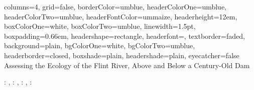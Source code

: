 \documentclass[b0paper,margin=1cm,landscape]{baposter}
\begin{document}

\begin{poster}{
    columns=4,
    grid=false,
    borderColor=umblue,
    headerColorOne=umblue,
    headerColorTwo=umblue,
    headerFontColor=ummaize,
    headerheight=12em,
    boxColorOne=white,
    boxColorTwo=umblue,
    linewidth=1.5pt,
    boxpadding=0.66em,
    headershape=rectangle,
    headerfont=\Large\textsf,
    textborder=faded,
    background=plain,
    bgColorOne=white,
    bgColorTwo=umblue,
    headerborder=closed,
    boxshade=plain,
    headershade=plain,
    eyecatcher=false
}
{
}
{Assessing the Ecology of the Flint River, Above and Below a Century-Old Dam}
{
  \vspace{0mm}
   : \textit{\color{violet}{summersj@umich.edu}}, 
   : \textit{\color{violet}{arelkins@umich.edu}}, 
   : \textit{\color{violet}{casonk@umich.edu}}, 
   : \textit{\color{violet}{hdawson@umich.edu}} 
  
}
\end{poster}
\end{document}
